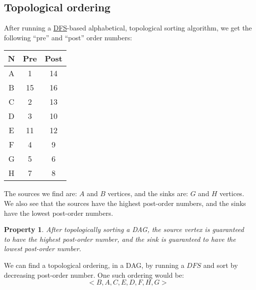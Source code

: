 \documentclass{article}
\newtheorem{property}{Property}[section]
\theoremstyle{definition}
\begin{document}
\subsection{Topological ordering}

After running a \hyperref[alg:dfs_dir]{DFS}-based alphabetical, topological sorting algorithm, we get the following ``pre'' and ``post'' order numbers:

\begin{center}
	\begin{tabular}{||c c c||} 
		\hline
		N & Pre & Post\\ [0.5ex] 
		\hline\hline
		A & 1 & 14 \\ 
		\hline
		B & 15 & 16\\
		\hline
		C & 2 & 13\\
		\hline
		D & 3 & 10\\
		\hline
		E & 11 & 12\\
		\hline
		F & 4 & 9\\
		\hline
		G & 5 & 6\\
		\hline
		H & 7 & 8\\ [1ex] 
		\hline
	\end{tabular}
\end{center}

The sources we find are: $A$ and $B$ vertices, and the sinks are: $G$ and $H$ vertices. We also see that the sources have the highest post-order numbers, and the sinks have the lowest post-order numbers.

\begin{property}
	\label{prop:topo_sort_sinksource}
	After topologically sorting a DAG, the source vertex is guaranteed to have the highest post-order number, and the sink is guaranteed to have the lowest post-order number. 
\end{property}

We can find a topological ordering, in a DAG, by running a $DFS$ and sort by decreasing post-order number. One such ordering would be:
$$<B, A, C, E, D, F, H,G>$$
\end{document}
